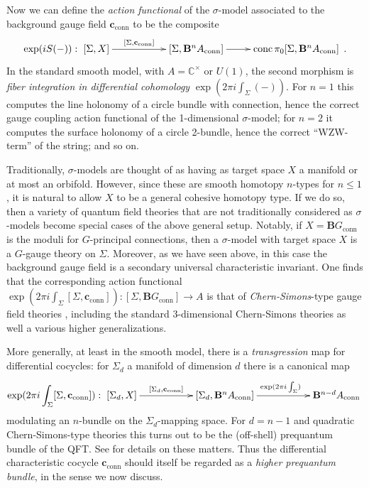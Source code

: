 \documentclass[copyright]{eptcs}
\begin{document}
Now we can define the \emph{action functional} of the $\sigma$-model associated
to the background gauge field $\mathbf{c}_{\mathrm{conn}}$ to be the composite
$$
  \exp(i S(-))
    :
  \xymatrix{
    [\Sigma, X]
  \ar[rr]^-{[\Sigma, \mathbf{c}_{\mathrm{conn}}]}
  &&
  [\Sigma, \mathbf{B}^n A_{\mathrm{conn}}]
  \ar[r]
  &
  \mathrm{conc}\,\pi_0 [\Sigma, \mathbf{B}^n A_{\mathrm{conn}}]
  }
  \,.
$$
In the standard smooth model, with $A = \mathbb{C}^\times$ or
$U(1)$, the second morphism is \emph{fiber integration in differential cohomology}
$\exp(2 \pi i \int_{\Sigma}(-))$.
For $n = 1$ this computes the line holonomy of a circle bundle with connection,
hence the correct gauge coupling action functional of the 1-dimensional $\sigma$-model; for
$n = 2$ it computes the surface holonomy of a circle 2-bundle, hence the
correct ``WZW-term'' of the string; and so on.

Traditionally, $\sigma$-models are thought of as having as target space $X$ a manifold
or at most an orbifold. However, since these are smooth homotopy $n$-types for $n \leq 1$, it is natural to
allow $X$ to be a general cohesive homotopy type.
If we do so, then a variety of
quantum field theories that are not traditionally considered as $\sigma$-models become
special cases of the above general setup.
Notably, if $X = \mathbf{B}G_{\mathrm{conn}}$ is
the moduli for $G$-principal connections, then a $\sigma$-model with target space $X$ is
a $G$-gauge theory on $\Sigma$. Moreover, as we have seen above, in this case the background
gauge field is a secondary universal characteristic invariant. One finds that the corresponding
action functional
$
 \exp(2 \pi i \int_\Sigma [\Sigma, \mathbf{c}_{\mathrm{conn}}])
 : [\Sigma, \mathbf{B}G_{\mathrm{conn}}] \to A
$
is that of \emph{Chern-Simons}-type gauge field theories \cite{FSS, CS},
including the standard 3-dimensional Chern-Simons theories as well a
various higher generalizations.

More generally, at least in the smooth model, there is a \emph{transgression} map for
differential cocycles: for
$\Sigma_d$ a manifold of dimension $d$ there is a canonical map
$$
  \exp(2 \pi i \int_{\Sigma}[\Sigma,\mathbf{c}_{\mathrm{conn}}])
  :
  \xymatrix{
    [\Sigma_d, X]
  \ar[rr]^-{[\Sigma_d, \mathbf{c}_{\mathrm{conn}}]}
  &&
  [\Sigma_d, \mathbf{B}^n A_{\mathrm{conn}}]
  \ar[rr]^{\exp(2 \pi i \int_\Sigma)}
  &&
  \mathbf{B}^{n-d} A_{\mathrm{conn}}
  }
$$
modulating an $n$-bundle on the $\Sigma_d$-mapping space. For $d = n-1$ and
quadratic Chern-Simons-type theories this turns out to be the (off-shell)
prequantum bundle of the QFT. See \cite{FSS} for details on these matters.
Thus the differential characteristic
cocycle $\mathbf{c}_{\mathrm{conn}}$ should itself be regarded as a
\emph{higher prequantum bundle}, in the sense we now discuss.
\end{document}
